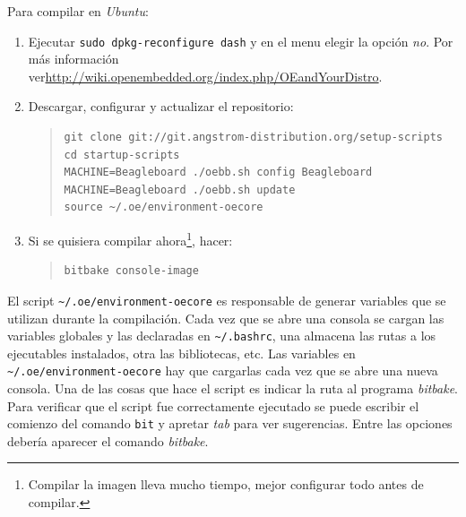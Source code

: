 \documentclass[main]{subfiles}
\begin{document}
Para compilar en \textit{Ubuntu}:
\begin{enumerate}
\item Ejecutar \verb+sudo dpkg-reconfigure dash+ y en el menu elegir la opción \textit{no}. Por más información ver\newline\url{http://wiki.openembedded.org/index.php/OEandYourDistro}.
\item Descargar, configurar y actualizar el repositorio:
\begin{quote}
\begin{verbatim}
git clone git://git.angstrom-distribution.org/setup-scripts
cd startup-scripts
MACHINE=Beagleboard ./oebb.sh config Beagleboard
MACHINE=Beagleboard ./oebb.sh update
source ~/.oe/environment-oecore
\end{verbatim}
\end{quote}
\item Si se quisiera compilar ahora\footnote{Compilar la imagen lleva mucho tiempo, mejor configurar todo antes de compilar.}, hacer:
\begin{quote}
\begin{verbatim}
bitbake console-image
\end{verbatim}
\end{quote}
\end{enumerate}

El script \verb+~/.oe/environment-oecore+ es responsable de generar variables que se utilizan durante la compilación. Cada vez que se abre una consola se cargan las variables globales y las declaradas en \verb+~/.bashrc+, una almacena las rutas a los ejecutables instalados, otra las bibliotecas, etc. Las variables en \verb+~/.oe/environment-oecore+ hay que cargarlas cada vez que se abre una nueva consola. Una de las cosas que hace el script es indicar la ruta al programa \textit{bitbake}. Para verificar que el script fue correctamente ejecutado se puede escribir el comienzo del comando \verb+bit+ y apretar \textit{tab} para ver sugerencias. Entre las opciones debería aparecer el comando \textit{bitbake}.\\
\end{document}
